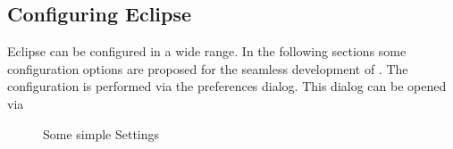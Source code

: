 \subsection{Configuring Eclipse}

Eclipse can be configured in a wide range. In the following sections
some configuration options are proposed for the seamless development
of \ExTeX. The configuration is performed via the preferences dialog.
This dialog can be opened via 
\begin{figure}[htp]
  \hbox{}\hfill
  \hfill
  \caption{Some simple Settings}
\end{figure}

